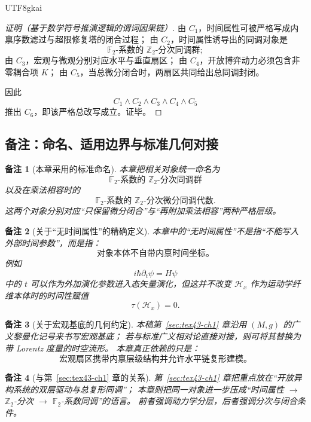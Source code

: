 \documentclass[12pt]{article}
\newtheorem{remark}{备注}[section]
\newcommand{\Ztwo}{\mathbb{Z}_2}
\newcommand{\Ftwo}{\mathbb{F}_2}
\begin{document}
\begin{CJK*}{UTF8}{gkai}
\begin{proof}[证明（基于数学符号推演逻辑的谓词因果链）]
由 $C_1$，时间属性可被严格写成内禀序数滤过与超限修复塔的闭合过程；
由 $C_2$，时间属性诱导出的同调对象是
\[
  \Ftwo\text{-系数的 }\Ztwo\text{-分次同调群};
\]
由 $C_3$，宏观与微观分别对应水平与垂直扇区；
由 $C_4$，开放博弈动力必须包含非零耦合项 $K$；
由 $C_5$，当总微分闭合时，两扇区共同给出总同调封闭。

因此
\[
  C_1\wedge C_2\wedge C_3\wedge C_4\wedge C_5
\]
推出 $C_6$，即该严格总改写成立。证毕。
\end{proof}

\subsection{备注：命名、适用边界与标准几何对接}
\label{subsec:tex43-ch2-remarks}

\begin{remark}[本章采用的标准命名]
本章把相关对象统一命名为
\[
  \Ftwo\text{-系数的 }\Ztwo\text{-分次同调群}
\]
以及在乘法相容时的
\[
  \Ftwo\text{-系数的 }\Ztwo\text{-分次微分同调代数}.
\]
这两个对象分别对应“只保留微分闭合”与“再附加乘法相容”两种严格层级。
\end{remark}

\begin{remark}[关于“无时间属性”的精确定义]
本章中的“无时间属性”不是指“不能写入外部时间参数”，而是指：
\[
  \text{对象本体不自带内禀时间坐标。}
\]
例如
\[
  i\hbar \partial_t\psi = H\psi
\]
中的 $t$ 可以作为外加演化参数进入态矢量演化，但这并不改变 $\mathcal H_x$ 作为运动学纤维本体时的时间性赋值
\[
  \tau(\mathcal H_x)=0.
\]
\end{remark}

\begin{remark}[关于宏观基底的几何约定]
本稿第~\ref{sec:tex43-ch1} 章沿用 $(M,g)$ 的广义黎曼化记号来书写宏观基底；
若与标准广义相对论直接对接，则可将其替换为带 Lorentz 度量的时空流形。
本章真正依赖的只是：
\[
  \text{宏观扇区携带内禀层级结构并允许水平链复形建模。}
\]
\end{remark}

\begin{remark}[与第~\ref{sec:tex43-ch1} 章的关系]
第~\ref{sec:tex43-ch1} 章把重点放在“开放异构系统的双层驱动与总复形同调”；
本章则把同一对象进一步压成“时间属性 $\to$ \(\Ztwo\)-分次 $\to$ \(\Ftwo\)-系数同调”的语言。
前者强调动力学分层，后者强调分次与闭合条件。
\end{remark}

\clearpage


\end{CJK*}
\end{document}
